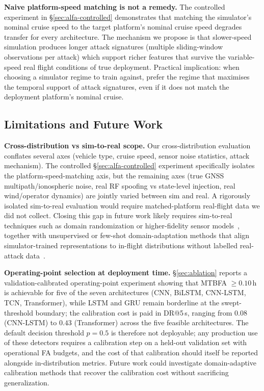 \documentclass{ieeeaccess}
\begin{document}
\textbf{Naive platform-speed matching is not a remedy.}
The controlled experiment in \S\ref{sec:alfa-controlled} demonstrates
that matching the simulator's nominal cruise speed to the target
platform's nominal cruise speed degrades transfer for every architecture.
The mechanism we propose is that slower-speed simulation produces longer
attack signatures (multiple sliding-window observations per attack)
which support richer features that survive the variable-speed real
flight conditions of true deployment. Practical implication: when
choosing a simulator regime to train against, prefer the regime that
maximises the temporal support of attack signatures, even if it does not
match the deployment platform's nominal cruise.

\subsection{Limitations and Future Work}
\label{sec:limitations}

\textbf{Cross-distribution vs sim-to-real scope.}
Our cross-distribution evaluation conflates several axes
(vehicle type, cruise speed, sensor noise statistics, attack mechanism).
The controlled \S\ref{sec:alfa-controlled} experiment specifically
isolates the platform-speed-matching axis, but the remaining axes
(true GNSS multipath/ionospheric noise, real RF spoofing vs state-level
injection, real wind/operator dynamics) are jointly varied between sim
and real. A rigorously isolated sim-to-real evaluation would require
matched-platform real-flight data we did not collect. Closing this gap
in future work likely requires sim-to-real techniques such as domain
randomization or higher-fidelity sensor models~\cite{ref51}, together
with unsupervised or few-shot domain-adaptation methods that align
simulator-trained representations to in-flight distributions without
labelled real-attack data~\cite{ref52}.

\textbf{Operating-point selection at deployment time.}
\S\ref{sec:ablation} reports a validation-calibrated operating-point
experiment showing that MTBFA $\ge 0.10$\,h is achievable for five of
the seven architectures (CNN, BiLSTM, CNN-LSTM, TCN, Transformer),
while LSTM and GRU remain borderline at the swept-threshold boundary;
the calibration cost is paid in DR@5\,s, ranging from $0.08$ (CNN-LSTM)
to $0.43$ (Transformer) across the five feasible architectures.
The default decision threshold $p=0.5$ is therefore not deployable; any
production use of these detectors requires a calibration step on a
held-out validation set with operational FA budgets, and the cost of
that calibration should itself be reported alongside in-distribution
metrics. Future work could investigate domain-adaptive calibration
methods that recover the calibration cost without sacrificing
generalization.
\end{document}
